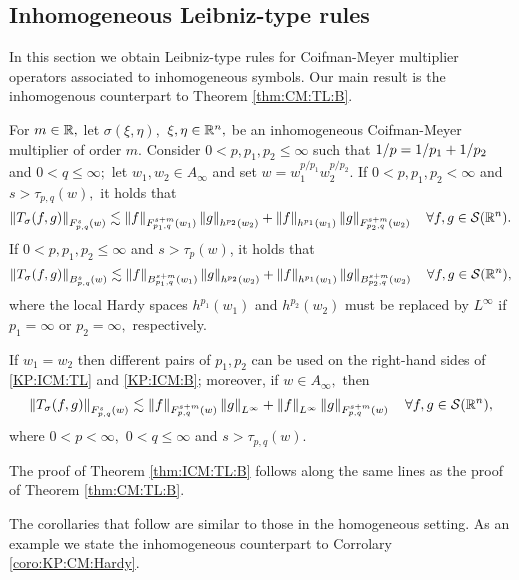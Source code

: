  \subsection{Inhomogeneous Leibniz-type rules}
 In this section we obtain Leibniz-type rules for Coifman-Meyer multiplier operators associated to inhomogeneous symbols. Our main result is the inhomogenous counterpart to Theorem \ref{thm:CM:TL:B}. 
 
\begin{theorem}\label{thm:ICM:TL:B}  For $m \in \re,$ let $\sigma(\xi,\eta),$ $\xi,\eta\in\rn,$ be an inhomogeneous Coifman-Meyer multiplier of order $m.$ Consider  $0 < p, p_1, p_2  \le \infty$  such that $\hcline$ and  $0 < q \leq \infty;$ let  $w_1,w_2\in A_\infty$ and set $w=w_1^{{p}/{p_1}} w_2^{{p}/{p_2}}.$ 
If $0 < p,p_1,p_2 < \infty$ and  $s > \tau_{p,q}(w),$  it holds that
\begin{equation}\label{KP:ICM:TL}
\norm{T_\sigma(f,g)}{\itlw{p}{s}{q}{w}} \lesssim \norm{f}{\itlw{p_1}{s+m}{q}{w_1}} \norm{g}{h^{p_2}(w_2)} +  \norm{f}{h^{p_1}(w_1)}   \norm{g}{\itlw{p_2}{s+m}{q}{w_2}} \quad \forall f, g \in \sw.
\end{equation}
If $0< p, p_1,p_2\leq \infty$ and $s > \tau_p(w)$, it holds that
\begin{equation}\label{KP:ICM:B}
\norm{T_\sigma(f,g)}{\ibesw{p}{s}{q}{w}} \lesssim \norm{f}{\ibesw{p_1}{s+m}{q}{w_1} } \norm{g}{h^{p_2}(w_2)} +  \norm{f}{h^{p_1}(w_1)}   \norm{g}{\ibesw{p_2}{s+m}{q}{w_2} } \quad \forall f, g \in \sw,
\end{equation}
where the local Hardy spaces $h^{p_1}(w_1)$ and $h^{p_2}(w_2)$ must be replaced by $L^\infty$ if $p_1=\infty$ or $p_2=\infty,$ respectively.

If $w_1=w_2$ then different pairs of $p_1, p_2$ can be used on the right-hand sides of \eqref{KP:ICM:TL} and \eqref{KP:ICM:B}; moreover, if $w\in A_\infty,$ then 
\begin{equation*}
\norm{T_\sigma(f,g)}{\itlw{p}{s}{q}{w}} \lesssim \norm{f}{\itlw{p}{s+m}{q}{w} } \norm{g}{L^\infty} +  \norm{f}{L^\infty}   \norm{g}{\itlw{p}{s+m}{q}{w}} \quad \forall f, g \in \sw,
\end{equation*}
where $0<p<\infty,$ $0<q\le\infty$ and $s>\tau_{p,q}(w).$
\end{theorem} 

The proof of Theorem \ref{thm:ICM:TL:B} follows along the same lines as the proof of Theorem \ref{thm:CM:TL:B}. 
 
The corollaries that follow are similar to those in the homogeneous setting. As an example we state the inhomogeneous counterpart to Corrolary \ref{coro:KP:CM:Hardy}.
 
